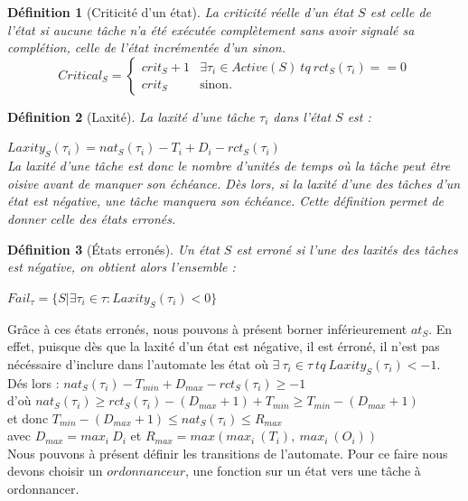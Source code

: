 \documentclass[a4paper]{report}
\theoremstyle{break}
\newtheorem{defin}{Définition}
\theoremstyle{breakplain}
\begin{document}
\begin{defin}[Criticité d'un état]
\label{critical}
La criticité réelle d'un état $S$ est celle de l'état si aucune tâche n'a été exécutée complètement sans avoir signalé sa complétion, celle de l'état incrémentée d'un sinon.
$$
Critical_S = \left\{
    \begin{array}{ll}
        crit_S+1 & \exists \tau_i \in Active(S)\ tq\ rct_S(\tau_i) == 0 \\
        crit_S & \mbox{sinon.}
    \end{array}
\right.
$$
\end{defin}

\begin{defin}[Laxité]
\label{laxity}
La laxité d'une tâche $\tau_i$ dans l'état $S$ est :

$Laxity_S(\tau_i) = nat_S(\tau_i) -T_i + D_i - rct_S(\tau_i)$\\

La laxité d'une tâche est donc le nombre d'unités de temps où la tâche peut être oisive avant de manquer son échéance. Dès lors, si la laxité d'une des tâches d'un état est négative, une tâche manquera son échéance. Cette définition permet de donner celle des états erronés.
\end{defin}

\begin{defin}[États erronés]
\label{failstate}
Un état $S$ est erroné si l'une des laxités des tâches est négative, on obtient alors l'ensemble :

$Fail_\tau = \{S|\exists \tau_i \in \tau : Laxity_S(\tau_i) < 0  \}$\\
\end{defin}

Grâce à ces états erronés, nous pouvons à présent borner inférieurement $at_S$. En effet, puisque dès que la laxité d'un état est négative, il est érroné, il n'est pas nécéssaire d'inclure dans l'automate les état où $\exists\ \tau_i \in \tau\ tq\ Laxity_S(\tau_i) < -1$.\\
Dés lors : $nat_S(\tau_i) -T_{min} + D_{max} - rct_S(\tau_i) \geq -1$\\
d'où $nat_S(\tau_i) \geq rct_S(\tau_i) - (D_{max}+1) + T_{min} \geq T_{min}-(D_{max}+1)$\\
et donc $T_{min}-(D_{max}+1) \leq nat_S(\tau_i) \leq R_{max}$\\
avec $D_{max} = max_i\ D_i$ et $R_{max} = max(max_i\ (T_i),\ max_i\ (O_i))$\\

Nous pouvons à présent définir les transitions de l'automate. Pour ce faire nous devons choisir un $ordonnanceur$, une fonction sur un état vers une tâche à ordonnancer.
\end{document}
